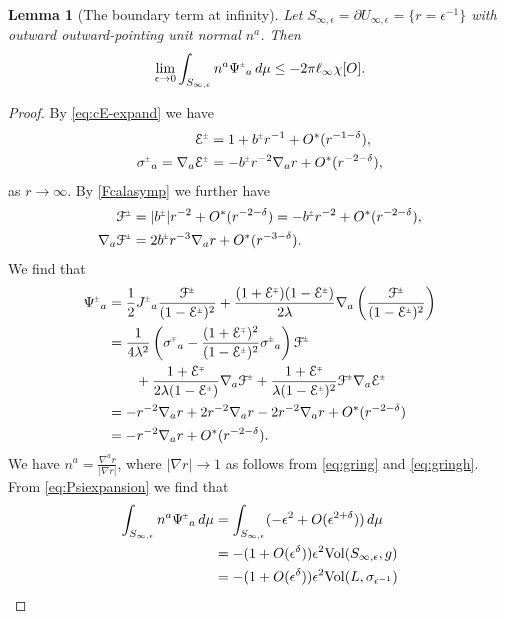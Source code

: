 \documentclass[a4paper,10pt,reqno]{amsart}
\newcommand{\cE}{\mathcal{E}}
\theoremstyle{plain}
\newtheorem{lemma}[thm]{Lemma}
\newcommand{\PM}[1]{{{#1}^{\hspace{-.5pt}\scaleto{\pm}{3.5pt}}}}
\newcommand{\MP}[1]{{{#1}^{\hspace{-.5pt}\scaleto{\mp}{3.5pt}}}}
\def\Fcal{\mathcal{F}}
\def\Ecal{\mathcal{E}}
\numberwithin{equation}{section}
\newcommand{\eps}{\epsilon}
\begin{document}
%
%

\begin{lemma}[The boundary term at infinity] \label{lem:bdrinfty} 
Let $S_{\infty,\epsilon} = \partial U_{\infty,\epsilon} = \{ r = \eps^{-1}\}$ with outward outward-pointing unit normal $n^a$. Then
\begin{align}
\lim_{\eps \to 0}
\int_{S_{\infty,\epsilon}} n^a\PM{\Psi}_a \, d\mu
\leq -2\pi \ell_\infty \chi[O]. 
\end{align}
\end{lemma} 

\begin{proof} 
By \eqref{eq:cE-expand} we have
\begin{align}
\PM{\cE} &= 1 + \PM{b} r^{-1} + O^*(r^{-1- \delta}), \\
\PM{\sigma}_{a} = \nabla_a \PM{\cE}
&= -\PM{b} r^{-2} \nabla_a r + O^*(r^{-2- \delta}),
\end{align}
as $r \to \infty$. 
%
%
%
%
%
%
%
By \eqref{Fcalasymp} we further have 
\begin{align}
\PM{\Fcal}
&=|\PM{b}| r^{-2} + O^*(r^{-2-\delta})
=-\PM{b} r^{-2} + O^*(r^{-2-\delta}), \\
\nabla_a \PM{\Fcal}
&= 2\PM{b} r^{-3} \nabla_a r + O^*(r^{-3-\delta}).
\end{align}
We find that
\begin{align}
\PM{\Psi}_a
&=
\frac{1}{2} \PM{J}_a \frac{\PM{\Fcal}}{(1-\PM{\Ecal})^2}
+ \frac{(1 + \MP{\Ecal}) (1 -  \PM{\Ecal})}{2\lambda}
\nabla_a \left(\frac{\PM{\Fcal}}{(1-\PM{\Ecal})^2} \right)\\
&=
\frac{1}{4 \lambda^2} \left(
\MP{\sigma}_{a} - \frac{(1 + \MP{\Ecal})^2}{(1 - \PM{\Ecal})^2} \PM{\sigma}_{a}
\right) \PM{\Fcal} \\
&\qquad
+ \frac{1 + \MP{\Ecal}}{2\lambda(1-\PM{\Ecal})}
\nabla_a \PM{\Fcal}
+ \frac{1 + \MP{\Ecal}}{\lambda(1-\PM{\Ecal})^2}
\PM{\Fcal} \nabla_a \PM{\cE} \\
&=
- r^{-2} \nabla_a r + 2r^{-2} \nabla_a r - 2r^{-2} \nabla_a r + O^*(r^{-2-\delta})\\
&=
- r^{-2} \nabla_a r + O^*(r^{-2-\delta}) \label{eq:Psiexpansion}.
\end{align}
We have 
$n^a=\frac{\nabla^a r}{|\nabla r|}$, where $|\nabla r| \to 1$ as follows from \eqref{eq:gring} and \eqref{eq:gringh}. From \eqref{eq:Psiexpansion} we find that 
\begin{align}
\int_{S_{\infty,\epsilon}} n^a\PM{\Psi}_a \, d\mu
&= \int_{S_{\infty,\epsilon}}(-\eps^2 + O(\eps^{2 + \delta})) \, d\mu \\
&= - (1 + O(\eps^{\delta})) \eps^2 \mathrm{Vol}(S_{\infty,\epsilon},g) \\
&= - (1 + O(\eps^{\delta})) \eps^2 \mathrm{Vol}(L, \sigma_{\eps^{-1}}) %
%
\end{align}


\end{proof}
\end{document}

